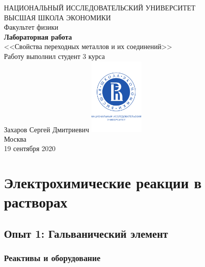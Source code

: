 \documentclass[a4paper, 12pt]{article}
\begin{document}
	\begin{titlepage}
		\begin{center}
			$$$$
			$$$$
			$$$$
			$$$$
			{\Large{НАЦИОНАЛЬНЫЙ ИССЛЕДОВАТЕЛЬСКИЙ УНИВЕРСИТЕТ}}\\
			\vspace{0.1cm}
			{\Large{ВЫСШАЯ ШКОЛА ЭКОНОМИКИ}}\\
			\vspace{0.25cm}
			{\large{Факультет физики}}\\
			\vspace{5.5cm}
			{\Huge\textbf{{Лабораторная работа}}}\\%
			\vspace{1cm}
			{\LARGE{<<Свойства переходных металлов и их соединений>>}}\\%
			\vspace{2cm}
			{Работу выполнил студент 3 курса}\\
			{Захаров Сергей Дмитриевич}
			\vfill
			\includegraphics[width = 0.2\textwidth]{HSElogo}\\
			\vfill
			Москва\\
			19 сентября 2020
		\end{center}
	\end{titlepage}

\tableofcontents

\newpage


\section{Электрохимические реакции в растворах}

\subsection{Опыт 1: Гальванический элемент}

\subsubsection{Реактивы и оборудование}
\end{document}
